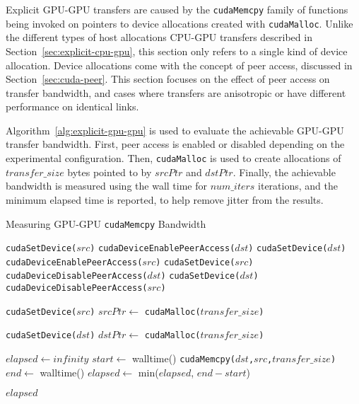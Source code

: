 Explicit GPU-GPU transfers are caused by the \texttt{cudaMemcpy} family of functions being invoked on pointers to device allocations created with \texttt{cudaMalloc}.
Unlike the different types of host allocations CPU-GPU transfers described in Section~\ref{sec:explicit-cpu-gpu}, this section only refers to a single kind of device allocation.
Device allocations come with the concept of peer access, discussed in Section~\ref{sec:cuda-peer}.
This section focuses on the effect of peer access on transfer bandwidth, and cases where transfers are anisotropic or have different performance on identical links.

Algorithm~\ref{alg:explicit-gpu-gpu} is used to evaluate the achievable GPU-GPU transfer bandwidth.
First, peer access is enabled or disabled depending on the experimental configuration.
Then, \texttt{cudaMalloc} is used to create allocations of $transfer\_size$ bytes pointed to by $srcPtr$ and $dstPtr$.
Finally, the achievable bandwidth is measured using the wall time for $num\_iters$ iterations, and the minimum elapsed time is reported, to help remove jitter from the results.

\begin{algorithm}[H]
	\caption[Measuring GPU-GPU \texttt{cudaMemcpy} Bandwidth]{Measuring GPU-GPU \texttt{cudaMemcpy} Bandwidth}
	\label{alg:explicit-gpu-gpu}
	\begin{algorithmic}[1]
		\Statex
		\State \texttt{cudaSetDevice($src$)}
		\State \texttt{cudaDeviceEnablePeerAccess($dst$)}
		\State \texttt{cudaSetDevice($dst$)}
		\State \texttt{cudaDeviceEnablePeerAccess($src$)}
		\Else
		\State \texttt{cudaSetDevice($src$)}
		\State \texttt{cudaDeviceDisablePeerAccess($dst$)}
		\State \texttt{cudaSetDevice($dst$)}
		\State \texttt{cudaDeviceDisablePeerAccess($src$)}        
		\EndIf
		
		\State \texttt{cudaSetDevice($src$)} 
		\State $srcPtr \gets$ \texttt{cudaMalloc($transfer\_size$)}
		
		\State \texttt{cudaSetDevice($dst$)} 
		\State $dstPtr \gets$ \texttt{cudaMalloc($transfer\_size$)}
		
		\State $elapsed \gets infinity$ 
		\State $start \gets$ walltime()
		\State \texttt{cudaMemcpy($dst$,$src$,$transfer\_size$)}
		\State $end \gets$ walltime()
		\State $elapsed \gets$ min($elapsed$, $end-start$)
		\EndFor
		
		\Return $elapsed$
		\EndFunction
		
	\end{algorithmic}
\end{algorithm}

